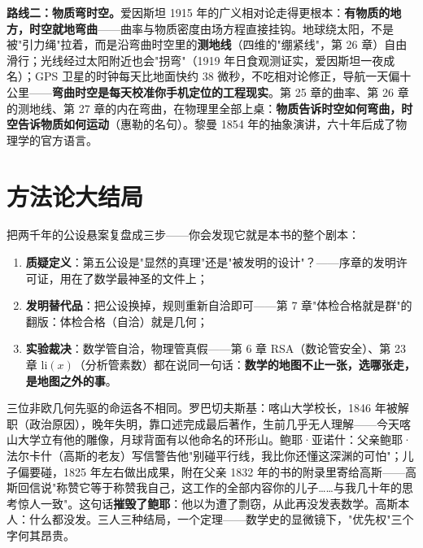 \textbf{路线二：物质弯时空。}爱因斯坦 1915 年的广义相对论走得更根本：\textbf{有物质的地方，时空就地弯曲}——曲率与物质密度由场方程直接挂钩。地球绕太阳，不是被"引力绳"拉着，而是沿弯曲时空里的\textbf{测地线}（四维的"绷紧线"，第 26 章）自由滑行；光线经过太阳附近也会"拐弯"（1919 年日食观测证实，爱因斯坦一夜成名）；GPS 卫星的时钟每天比地面快约 $38$ 微秒，不吃相对论修正，导航一天偏十公里——\textbf{弯曲时空是每天校准你手机定位的工程现实}。第 25 章的曲率、第 26 章的测地线、第 27 章的内在弯曲，在物理里全部上桌：\textbf{物质告诉时空如何弯曲，时空告诉物质如何运动}（惠勒的名句）。黎曼 1854 年的抽象演讲，六十年后成了物理学的官方语言。

\section{方法论大结局}

把两千年的公设悬案复盘成三步——你会发现它就是本书的整个剧本：

\begin{enumerate}
\item \textbf{质疑定义}：第五公设是"显然的真理"还是"被发明的设计"？——序章的发明许可证，用在了数学最神圣的文件上；
\item \textbf{发明替代品}：把公设换掉，规则重新自洽即可——第 7 章"体检合格就是群"的翻版：体检合格（自洽）就是几何；
\item \textbf{实验裁决}：数学管自洽，物理管真假——第 6 章 RSA（数论管安全）、第 23 章 $\mathrm{li}(x)$（分析管素数）都在说同一句话：\textbf{数学的地图不止一张，选哪张走，是地图之外的事}。
\end{enumerate}

\begin{lishi}
三位非欧几何先驱的命运各不相同。罗巴切夫斯基：喀山大学校长，1846 年被解职（政治原因），晚年失明，靠口述完成最后著作，生前几乎无人理解——今天喀山大学立有他的雕像，月球背面有以他命名的环形山。鲍耶·亚诺什：父亲鲍耶·法尔卡什（高斯的老友）写信警告他"别碰平行线，我比你还懂这深渊的可怕"；儿子偏要碰，1825 年左右做出成果，附在父亲 1832 年的书的附录里寄给高斯——高斯回信说"称赞它等于称赞我自己，这工作的全部内容你的儿子……与我几十年的思考惊人一致"。这句话\textbf{摧毁了鲍耶}：他以为遭了剽窃，从此再没发表数学。高斯本人：什么都没发。三人三种结局，一个定理——数学史的显微镜下，"优先权"三个字何其昂贵。
\end{lishi}

